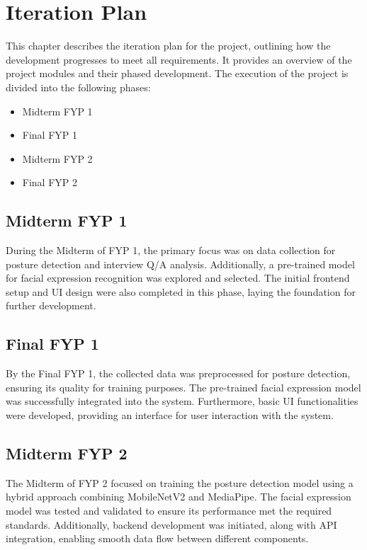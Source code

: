 \chapter{Iteration Plan}
\label{ch:iter0}

This chapter describes the iteration plan for the project, outlining how the development progresses to meet all requirements. It provides an overview of the project modules and their phased development. The execution of the project is divided into the following phases:

\begin{itemize}
    \item Midterm FYP 1
    \item Final FYP 1
    \item Midterm FYP 2
    \item Final FYP 2
\end{itemize}

\section{Midterm FYP 1}
During the Midterm of FYP 1, the primary focus was on data collection for posture detection and interview Q/A analysis. Additionally, a pre-trained model for facial expression recognition was explored and selected. The initial frontend setup and UI design were also completed in this phase, laying the foundation for further development.

\section{Final FYP 1}
By the Final FYP 1, the collected data was preprocessed for posture detection, ensuring its quality for training purposes. The pre-trained facial expression model was successfully integrated into the system. Furthermore, basic UI functionalities were developed, providing an interface for user interaction with the system.

\section{Midterm FYP 2}
The Midterm of FYP 2 focused on training the posture detection model using a hybrid approach combining MobileNetV2 and MediaPipe. The facial expression model was tested and validated to ensure its performance met the required standards. Additionally, backend development was initiated, along with API integration, enabling smooth data flow between different components.

